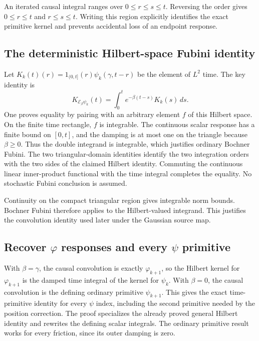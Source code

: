 \documentclass[11pt,a4paper]{report}
\begin{document}
An iterated causal integral ranges over \(0\le r\le s\le t\). Reversing the order gives \(0\le r\le t\) and \(r\le s\le t\). Writing this region explicitly identifies the exact primitive kernel and prevents accidental loss of an endpoint response.

\subsection{\texorpdfstring{The deterministic Hilbert-space Fubini identity}{The deterministic Hilbert-space Fubini identity}}
\label{report-step-KineticLangevin-KernelConvolution-lean-3}


Let \(K_k(t)(r)=1_{(0,t]}(r)\psi_k(\gamma,t-r)\) be the element of \(L^{2}\) time. The key identity is \[K_{\mathcal E_\beta\psi_k}(t)=\int_0^t e^{-\beta(t-s)}K_k(s)\,ds.\] One proves equality by pairing with an arbitrary element \(f\) of this Hilbert space. On the finite time rectangle, \(f\) is integrable. The continuous scalar response has a finite bound on \([0,t]\), and the damping is at most one on the triangle because \(\beta\ge0\). Thus the double integrand is integrable, which justifies ordinary Bochner Fubini. The two triangular-domain identities identify the two integration orders with the two sides of the claimed Hilbert identity. Commuting the continuous linear inner-product functional with the time integral completes the equality. No stochastic Fubini conclusion is assumed.



Continuity on the compact triangular region gives integrable norm bounds. Bochner Fubini therefore applies to the Hilbert-valued integrand. This justifies the convolution identity used later under the Gaussian source map.

\subsection{\texorpdfstring{Recover \(\varphi\) responses and every \(\psi\) primitive}{Recover φ responses and every ψ primitive}}
\label{report-step-KineticLangevin-KernelConvolution-lean-4}


With \(\beta=\gamma\), the causal convolution is exactly \(\varphi_{k+1}\), so the Hilbert kernel for \(\varphi_{k+1}\) is the damped time integral of the kernel for \(\psi_k\). With \(\beta=0\), the causal convolution is the defining ordinary primitive \(\psi_{k+1}\). This gives the exact time-primitive identity for every \(\psi\) index, including the second primitive needed by the position correction. The proof specializes the already proved general Hilbert identity and rewrites the defining scalar integrals. The ordinary primitive result works for every friction, since its outer damping is zero.
\end{document}
